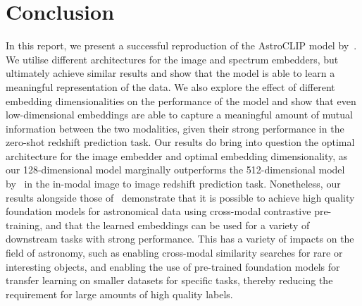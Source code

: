 
\section{Conclusion}\label{sec:conclusion}
In this report, we present a successful reproduction of the AstroCLIP model by~\cite{astroclip}.
We utilise different architectures for the image and spectrum embedders, but ultimately achieve similar results
and show that the model is able to learn a meaningful representation of the data.
We also explore the effect of different embedding dimensionalities on the performance of the model and show that
even low-dimensional embeddings are able to capture a meaningful amount of mutual information between the two modalities,
given their strong performance in the zero-shot redshift prediction task.
Our results do bring into question the optimal architecture for the image embedder and optimal
embedding dimensionality, as our 128-dimensional model marginally outperforms the 512-dimensional model by~\cite{astroclip}
in the in-modal image to image redshift prediction task.
Nonetheless, our results alongside those of~\cite{astroclip} demonstrate that it is possible to achieve high quality foundation
models for astronomical data using cross-modal contrastive pre-training, and that the learned embeddings can be used for a variety
of downstream tasks with strong performance.
This has a variety of impacts on the field of astronomy, such as enabling cross-modal similarity searches for rare or interesting
objects, and enabling the use of pre-trained foundation models for transfer learning on smaller datasets for specific tasks,
thereby reducing the requirement for large amounts of high quality labels.
